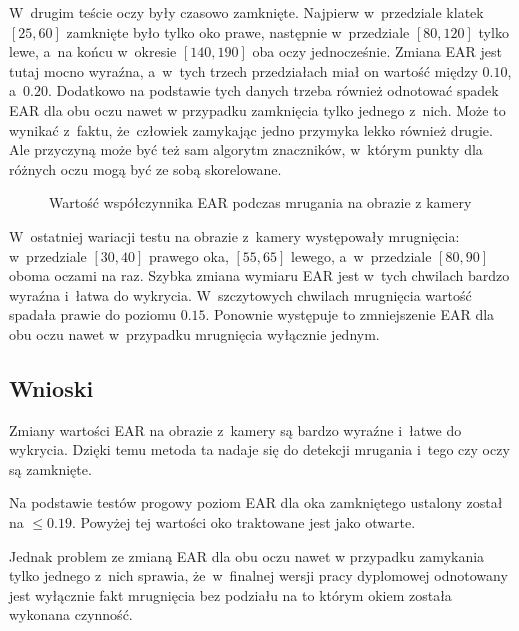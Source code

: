 W~drugim teście oczy były czasowo zamknięte. Najpierw w~przedziale klatek $[25, 60]$ zamknięte było tylko oko prawe, następnie w~przedziale $[80,120]$ tylko lewe, a~na końcu w~okresie $[140,190]$ oba oczy jednocześnie. Zmiana EAR jest tutaj mocno wyraźna, a~w~tych trzech przedziałach miał on wartość między $0.10$, a~$0.20$. Dodatkowo na podstawie tych danych trzeba również odnotować spadek EAR dla obu oczu nawet w przypadku zamknięcia tylko jednego z~nich. Może to wynikać z~faktu, że~człowiek zamykając jedno przymyka lekko również drugie. Ale przyczyną może być też sam algorytm znaczników, w~którym punkty dla różnych oczu mogą być ze sobą skorelowane.

\begin{figure}[!h]
    \centering
    \caption{Wartość współczynnika EAR podczas mrugania na obrazie z kamery}
    \label{fig:ear_live_blink}
\end{figure}

W~ostatniej wariacji testu na obrazie z~kamery występowały mrugnięcia: w~przedziale $[30,40]$ prawego oka, $[55,65]$ lewego, a~w~przedziale $[80,90]$ oboma oczami na raz. Szybka zmiana wymiaru EAR jest w~tych chwilach bardzo wyraźna i~łatwa do wykrycia. W~szczytowych chwilach mrugnięcia wartość spadała prawie do poziomu $0.15$. Ponownie występuje to zmniejszenie EAR dla obu oczu nawet w~przypadku mrugnięcia wyłącznie jednym. 


\subsection{Wnioski}

Zmiany wartości EAR na obrazie z~kamery są bardzo wyraźne i~łatwe do wykrycia. Dzięki temu metoda ta nadaje się do detekcji mrugania i~tego czy oczy są zamknięte. 

\vspace{3mm}

Na podstawie testów progowy poziom EAR dla oka zamkniętego ustalony został na $\leq0.19$. Powyżej tej wartości oko traktowane jest jako otwarte. 

\vspace{3mm}

Jednak problem ze zmianą EAR dla obu oczu nawet w przypadku zamykania tylko jednego z~nich sprawia, że~w~finalnej wersji pracy dyplomowej odnotowany jest wyłącznie fakt mrugnięcia bez podziału na to którym okiem została wykonana czynność.

